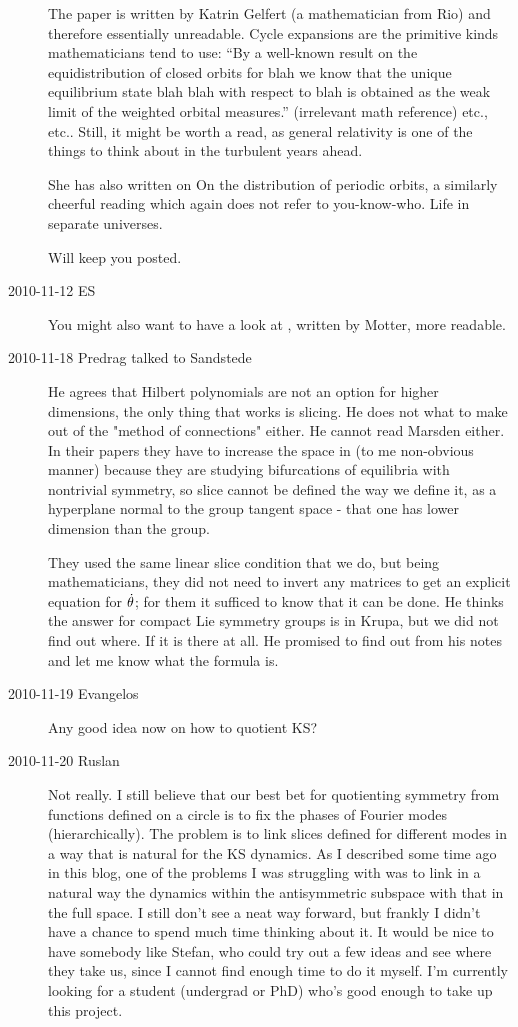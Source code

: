 \begin{description}
The paper is written by
{Katrin Gelfert} (a mathematician from Rio) and therefore essentially unreadable.
 Cycle expansions are the primitive kinds mathematicians tend to use:
``By a well-known result on the equidistribution of closed orbits for blah
we know that the unique equilibrium state blah blah with respect to blah
is obtained as the weak limit of the weighted orbital measures.''
(irrelevant math reference) etc., etc.. Still, it might be worth a read, as
general relativity is one of the things to think about in the
turbulent years ahead.

She has also written on
{On the distribution of periodic orbits}, a similarly cheerful reading
which again does not refer to you-know-who. Life in separate universes.

Will keep you posted.

\item[2010-11-12 ES] You might also want to have a look at \cite{motter09},
written by Motter, more readable.

\item[2010-11-18 Predrag talked to Sandstede]
He agrees that Hilbert polynomials are not an option for higher dimensions,
the only thing that works is slicing. He does not what to make out
of the "method of connections" either. He cannot read Marsden either.
In their papers they have to increase the
space in (to me non-obvious manner) because they are studying
bifurcations of equilibria with nontrivial symmetry, so slice cannot be
defined the way we define it, as a hyperplane normal to the group tangent
space - that one has lower dimension than the group.

They used the same linear slice condition that we do, but being mathematicians,
they did not need to invert any matrices to get an explicit equation for
$\dot{\theta}$; for them it sufficed to know that it can be done.
He thinks the answer for compact Lie symmetry groups is in Krupa, but
we did not find out where. If it is there at all. He promised to find out
from his notes and let me know what the formula is.

\item[2010-11-19 Evangelos]
Any good idea now on how to quotient KS?

\item[2010-11-20 Ruslan]
Not really.  I still believe that our best bet for quotienting 
symmetry from functions defined on a circle is to fix the phases of
Fourier modes (hierarchically).  The problem is to link slices defined
for different modes in a way that is natural for the KS dynamics.  As I
described some time ago in this blog, one of the problems I was struggling
with was to link in a natural way the dynamics within the antisymmetric
subspace with that in the full space.  I still don't see a neat way
forward, but frankly I didn't have a chance to spend much time thinking
about it.  It would be nice to have somebody like Stefan, who could try
out a few ideas and see where they take us, since I cannot find enough
time to do it myself.  I'm currently looking for a student (undergrad or
PhD) who's good enough to take up this project.



\end{description}
